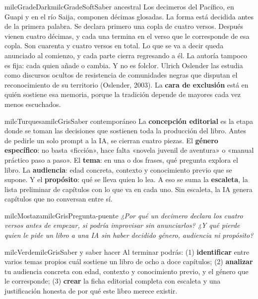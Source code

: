 \documentclass[11pt,letterpaper]{article}
\begin{document}
\begin{softbox}{milcGradeDark}{milcGradeSoft}{Saber ancestral}
Los decimeros del Pacífico, en Guapi y en el río Saija, componen décimas glosadas. La forma está decidida antes de la primera palabra. Se declara primero una copla de cuatro versos. Después vienen cuatro décimas, y cada una termina en el verso que le corresponde de esa copla. Son cuarenta y cuatro versos en total. Lo que se va a decir queda anunciado al comienzo, y cada parte cierra regresando a él. La autoría tampoco es fija: cada quien añade o cambia. Y no es folclor. Ulrich Oslender las estudia como discursos ocultos de resistencia de comunidades negras que disputan el reconocimiento de su territorio (Oslender, 2003). La \textbf{cara de exclusión} está en quién sostiene esa memoria, porque la tradición depende de mayores cada vez menos escuchados.\par{}
\end{softbox}

\begin{softbox}{milcTurquesa}{milcGris}{Saber contemporáneo}
La \textbf{concepción editorial} es la etapa donde se toman las decisiones que sostienen toda la producción del libro. Antes de pedirle un solo prompt a la IA, se cierran cuatro piezas. El \textbf{género específico}: no basta «ficción», hace falta «novela juvenil de aventura» o «manual práctico paso a paso». El \textbf{tema}: en una o dos frases, qué pregunta explora el libro. La \textbf{audiencia}: edad concreta, contexto y conocimiento previo que se supone. Y el \textbf{propósito}: qué se lleva quien lo lea. A eso se suma la \textbf{escaleta}, la lista preliminar de capítulos con lo que va en cada uno. Sin escaleta, la IA genera capítulos que no conversan entre sí.
\end{softbox}

\begin{softbox}{milcMostaza}{milcGris}{Pregunta-puente}
\textit{¿Por qué un decimero declara los cuatro versos antes de empezar, si podría improvisar sin anunciarlos? ¿Y qué pierde quien le pide un libro a una IA sin haber decidido género, audiencia ni propósito?}
\end{softbox}

\begin{softbox}{milcVerde}{milcGris}{Saber y saber hacer}
Al terminar podrás: (1) \textbf{identificar} entre varios temas propios cuál sostiene un libro de ocho a doce capítulos; (2) \textbf{analizar} tu audiencia concreta con edad, contexto y conocimiento previo, y el género que le corresponde; (3) \textbf{crear} la ficha editorial completa con escaleta y una justificación honesta de por qué este libro merece existir.
\end{softbox}
\end{document}
